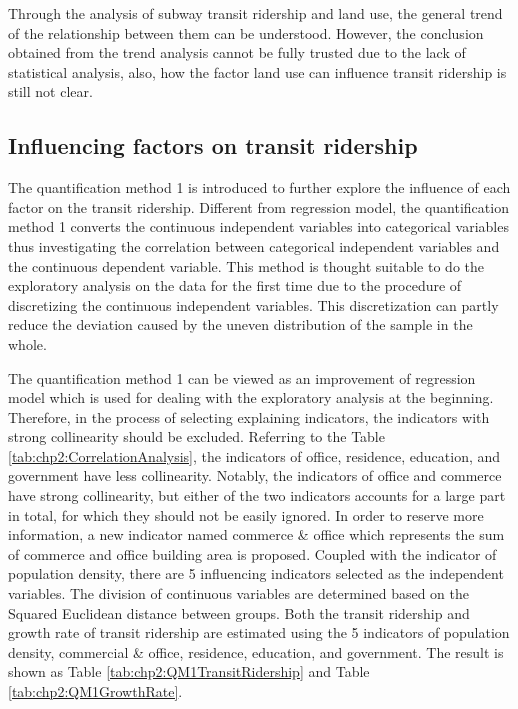 %
Through the analysis of subway transit ridership and land use, the general trend of the relationship between them can be understood. However, the conclusion obtained from the trend analysis cannot be fully trusted due to the lack of statistical analysis, also, how the factor land use can influence transit ridership is still not clear.

\subsection{Influencing factors on transit ridership}
%
The quantification method 1 is introduced to further explore the influence of each factor on the transit ridership. Different from regression model, the quantification method 1 converts the continuous independent variables into categorical variables thus investigating the correlation between categorical independent variables and the continuous dependent variable. This method is thought suitable to do the exploratory analysis on the data for the first time due to the procedure of discretizing the continuous independent variables. This discretization can partly reduce the deviation caused by the uneven distribution of the sample in the whole.

%
The quantification method 1 can be viewed as an improvement of regression model which is used for dealing with the exploratory analysis at the beginning. Therefore, in the process of selecting explaining indicators, the indicators with strong collinearity should be excluded. Referring to the Table \ref{tab:chp2:CorrelationAnalysis}, the indicators of office, residence, education, and government have less collinearity. Notably, the indicators of office and commerce have strong collinearity, but either of the two indicators accounts for a large part in total, for which they should not be easily ignored. In order to reserve more information, a new indicator named commerce \& office which represents the sum of commerce and office building area is proposed. Coupled with the indicator of population density, there are 5 influencing indicators selected as the independent variables. The division of continuous variables are determined based on the Squared Euclidean distance between groups. Both the transit ridership and growth rate of transit ridership are estimated using the 5 indicators of population density, commercial \& office, residence, education, and government. The result is shown as Table \ref{tab:chp2:QM1TransitRidership} and Table \ref{tab:chp2:QM1GrowthRate}.

